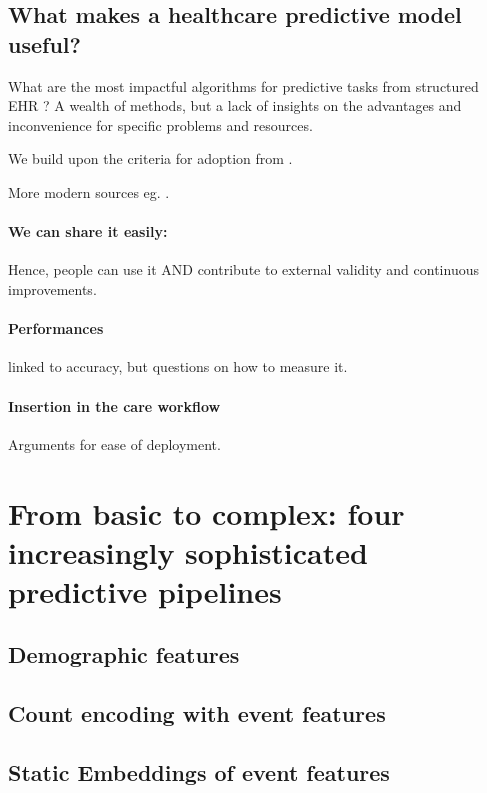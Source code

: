 \documentclass[french,12pt,twoside,a4paper]{book}
\begin{document}
\subsection{What makes a healthcare predictive model useful?}\label{subsec:predictive_models:useful}

What are the most impactful algorithms for predictive tasks from structured EHR
? A wealth of methods, but a lack of insights on the advantages and
inconvenience for specific problems and resources.

We build upon the criteria for adoption from \cite{wyatt1995commentary}.

More modern sources eg. \citep{subbaswamy2020development}.

\paragraph{We can share it easily: } Hence, people can use it AND contribute to
external validity and continuous improvements.

\paragraph{Performances} linked to accuracy, but questions on how to measure it.

\paragraph{Insertion in the care workflow}

Arguments for ease of deployment.

\section{From basic to complex: four increasingly sophisticated predictive pipelines}\label{sec:predictive_models:pipelines}

\subsection{Demographic features}\label{subsec:predictive_models:demographic}

\subsection{Count encoding with event features}\label{subsec:predictive_models:count_encoding}

\subsection{Static Embeddings of event features}
\end{document}
